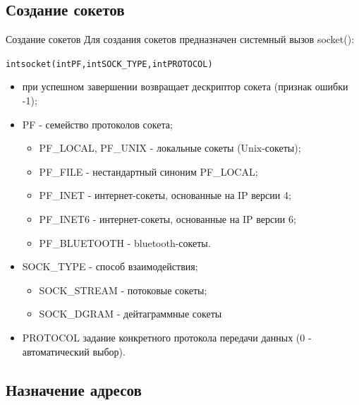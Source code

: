 \documentclass{beamer}
\begin{document}
\subsection{Создание сокетов}

\begin{frame}[fragile]{Создание сокетов}
	Для создания сокетов предназначен системный вызов socket():
	\begin{alltt}
		int socket (int PF, int SOCK\_TYPE, int PROTOCOL)
	\end{alltt}
	\begin{itemize}
		\item при успешном завершении возвращает дескриптор сокета (признак ошибки -1);
		\item PF - семейство протоколов сокета;
		\begin{itemize}
			\item PF\_LOCAL, PF\_UNIX - локальные сокеты (Unix-сокеты);
			\item PF\_FILE - нестандартный синоним PF\_LOCAL;
			\item PF\_INET - интернет-сокеты, основанные на IP версии 4;
			\item PF\_INET6 - интернет-сокеты, основанные на IP версии 6;
			\item PF\_BLUETOOTH - bluetooth-сокеты.
		\end{itemize}
		\item SOCK\_TYPE - способ взаимодействия;
		\begin{itemize}
			\item SOCK\_STREAM - потоковые сокеты;
			\item SOCK\_DGRAM - дейтаграммные сокеты
		\end{itemize}
		\item PROTOCOL задание конкретного протокола передачи данных (0 - автоматический выбор).
	\end{itemize}
\end{frame}

\subsection{Назначение адресов}
\end{document}
